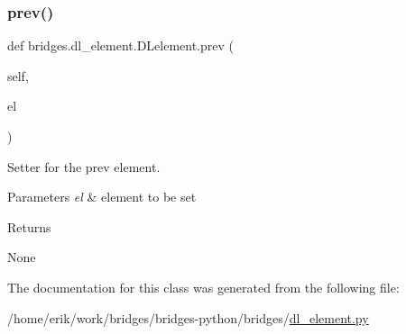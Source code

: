 \subsubsection{\texorpdfstring{prev()}{prev()}\hspace{0.1cm}{\footnotesize\ttfamily [2/2]}}
{\footnotesize\ttfamily def bridges.\+dl\+\_\+element.\+D\+Lelement.\+prev (\begin{DoxyParamCaption}\item[{}]{self,  }\item[{}]{el }\end{DoxyParamCaption})}



Setter for the prev element. 


\begin{DoxyParams}{Parameters}
{\em el} & element to be set\\
\hline
\end{DoxyParams}
\begin{DoxyReturn}{Returns}


None 
\end{DoxyReturn}


The documentation for this class was generated from the following file\+:\begin{DoxyCompactItemize}
\item 
/home/erik/work/bridges/bridges-\/python/bridges/\hyperlink{dl__element_8py}{dl\+\_\+element.\+py}\end{DoxyCompactItemize}
